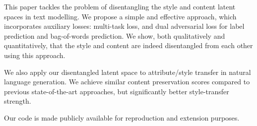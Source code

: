 This paper tackles the problem of disentangling the style and content latent spaces in text modelling. We propose a simple and effective approach, which incorporates auxiliary losses: multi-task loss, and dual adversarial loss for label prediction and bag-of-words prediction. We show, both qualitatively and quantitatively, that the style and content are indeed disentangled from each other using this approach.

We also apply our disentangled latent space to attribute/style transfer in natural language generation. We achieve similar content preservation scores compared to previous state-of-the-art approaches, but significantly better style-transfer strength.

Our code is made publicly available for reproduction and extension purposes.
